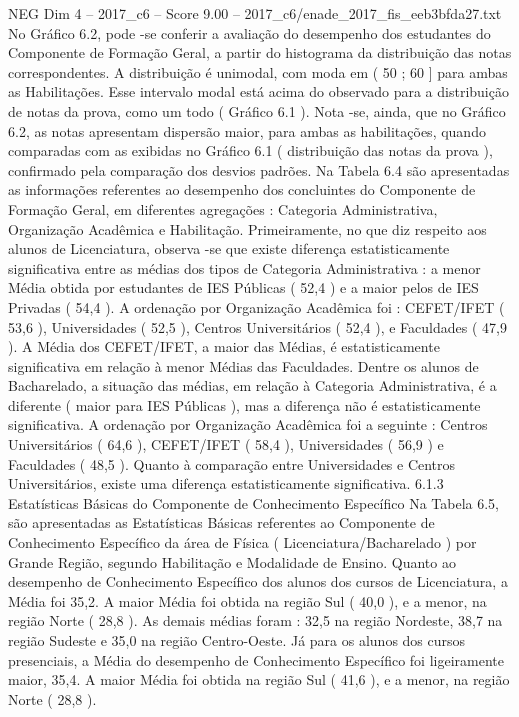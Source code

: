 \begin{textsample}{NEG Dim 4 – 2017\_c6 – Score 9.00 – 2017\_c6/enade\_2017\_fis\_eeb3bfda27.txt}
No Gráfico 6.2, pode -se conferir a avaliação do desempenho dos estudantes do Componente de Formação Geral, a partir do histograma da distribuição das notas correspondentes.
A distribuição é unimodal, com moda em ( 50 ; 60 ] para ambas as Habilitações.
Esse intervalo modal está acima do observado para a distribuição de notas da prova, como um todo ( Gráfico 6.1 ).
Nota -se, ainda, que no Gráfico 6.2, as notas apresentam dispersão maior, para ambas as habilitações, quando comparadas com as exibidas no Gráfico 6.1 ( distribuição das notas da prova ), confirmado pela comparação dos desvios padrões.
Na Tabela 6.4 são apresentadas as informações referentes ao desempenho dos concluintes do Componente de Formação Geral, em diferentes agregações : Categoria Administrativa, Organização Acadêmica e Habilitação.
Primeiramente, no que diz respeito aos alunos de Licenciatura, observa -se que existe diferença estatisticamente significativa entre as médias dos tipos de Categoria Administrativa : a menor Média obtida por estudantes de IES Públicas ( 52,4 ) e a maior pelos de IES Privadas ( 54,4 ).
A ordenação por Organização Acadêmica foi : CEFET/IFET ( 53,6 ), Universidades ( 52,5 ), Centros Universitários ( 52,4 ), e Faculdades ( 47,9 ).
A Média dos CEFET/IFET, a maior das Médias, é estatisticamente significativa em relação à menor Médias das Faculdades.
Dentre os alunos de Bacharelado, a situação das médias, em relação à Categoria Administrativa, é a diferente ( maior para IES Públicas ), mas a diferença não é estatisticamente significativa.
A ordenação por Organização Acadêmica foi a seguinte : Centros Universitários ( 64,6 ), CEFET/IFET ( 58,4 ), Universidades ( 56,9 ) e Faculdades ( 48,5 ).
Quanto à comparação entre Universidades e Centros Universitários, existe uma diferença estatisticamente significativa. 6.1.3 Estatísticas Básicas do Componente de Conhecimento Específico Na Tabela 6.5, são apresentadas as Estatísticas Básicas referentes ao Componente de Conhecimento Específico da área de Física ( Licenciatura/Bacharelado ) por Grande Região, segundo Habilitação e Modalidade de Ensino.
Quanto ao desempenho de Conhecimento Específico dos alunos dos cursos de Licenciatura, a Média foi 35,2.
A maior Média foi obtida na região Sul ( 40,0 ), e a menor, na região Norte ( 28,8 ).
As demais médias foram : 32,5 na região Nordeste, 38,7 na região Sudeste e 35,0 na região Centro-Oeste.
Já para os alunos dos cursos presenciais, a Média do desempenho de Conhecimento Específico foi ligeiramente maior, 35,4.
A maior Média foi obtida na região Sul ( 41,6 ), e a menor, na região Norte ( 28,8 ).

\end{textsample}
